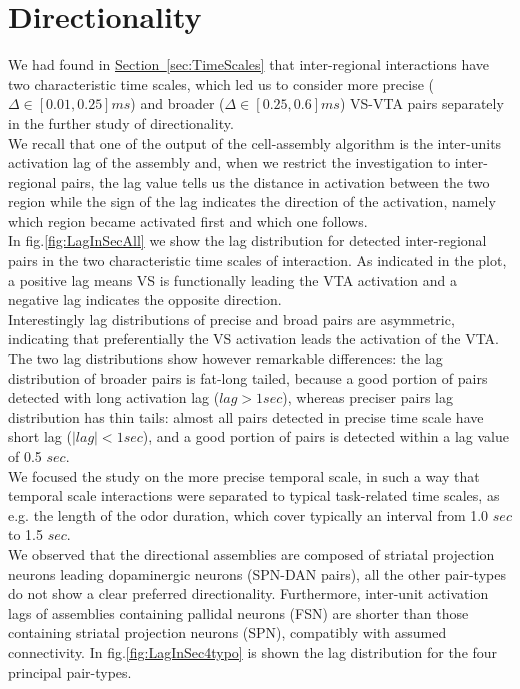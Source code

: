 \section{Directionality} 
\label{sec:Directionality}
We had found in \hyperref[sec:TimeScales]{Section~\ref*{sec:TimeScales}} that inter-regional interactions have two characteristic time scales, which led us to consider more precise ($\Delta \in [0.01,0.25] ms$) and broader ($\Delta \in [0.25,0.6] ms$) VS-VTA pairs separately in the further study of directionality.\\We recall that one of the output of the cell-assembly algorithm is the inter-units activation lag of the assembly and, when we restrict the investigation to inter-regional pairs, the lag value tells us the distance in activation between the two region while the sign of the lag indicates the direction of the activation, namely which region became activated first and which one follows.\\
In fig.\ref{fig:LagInSecAll} we show the lag distribution for detected inter-regional pairs in the two characteristic time scales of interaction. As indicated in the plot, a positive lag means VS is functionally leading the VTA activation and a negative lag indicates the opposite direction.\\Interestingly lag distributions of precise and broad pairs are asymmetric, indicating that preferentially the VS activation leads the activation of the VTA. The two lag distributions show however remarkable differences: the lag distribution of broader pairs is fat-long tailed, because a good portion of pairs detected with long activation lag ($lag > 1 sec$), whereas preciser pairs lag distribution has thin tails: almost all pairs detected in precise time scale have short lag ($|lag| < 1 sec$), and a good portion of pairs is detected within a lag value of 0.5 $sec$.\\
We focused the study on the more precise temporal scale, in such a way that temporal scale interactions were separated to typical task-related time scales, as e.g. the length of the odor duration, which cover typically an interval from 1.0 $sec$ to 1.5 $sec$.\\
We observed that the directional assemblies are composed of striatal projection neurons leading dopaminergic neurons (SPN-DAN pairs), all the other pair-types do not show a clear preferred directionality. Furthermore, inter-unit activation lags of assemblies containing pallidal neurons (FSN) are shorter than those containing striatal projection neurons (SPN), compatibly with assumed connectivity. In fig.\ref{fig:LagInSec4typo} is shown the lag distribution for the four principal pair-types.\\

